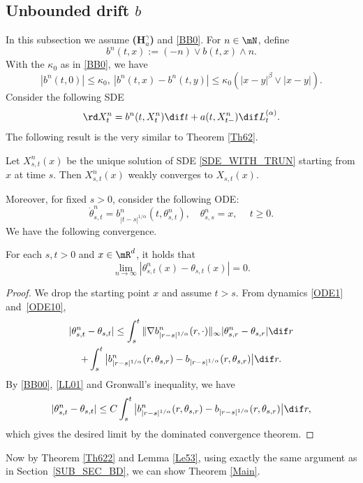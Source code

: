 \subsection{Unbounded drift $b$} \label{SUB_SEC_TRUNC}
In this subsection we assume {\bf (H$^\gamma_a$)} and \eqref{BB0}.
For $n\in\mN$, define
\[
b^n(t,x):=(-n)\vee b(t,x)\wedge n.
\]
With the $\kappa_0$ as in \eqref{BB0}, we have
\begin{equation}\label{BB00}
|b^n(t,0)|\le \kappa_0,\ |b^n(t,x)-b^n(t,y)|\leq\kappa_0(|x-y|^\beta\vee|x-y|).
\end{equation}
Consider the following SDE
\begin{equation}
\rd X_t^n=b^n(t,X_t^n)\dif t+a(t,X_{t-}^n)\dif L^{(\alpha)}_t.
\label{SDE_WITH_TRUN}
\end{equation}
The following result is the very similar to Theorem \ref{Th62}.
\begin{theorem}\label{Th622}
Let $X^n_{s,t}(x)$ be the unique solution of SDE \eqref{SDE_WITH_TRUN} starting from $x$ at time $s$. Then $X^n_{s,t}(x)$ weakly converges to $X_{s,t}(x)$.
\end{theorem}
Moreover, for fixed $s>0$, consider the following ODE:
\begin{equation}\label{ODE10}
\dot\theta^n_{s,t}=b^n_{|t-s|^{1/\alpha}}(t,\theta^n_{s,t}),\quad \theta^n_{s,s}=x,\quad \ t\geq 0.
\end{equation}
We have the following convergence.
\begin{lemma}\label{Le53}
For each $s,t>0$ and $x\in\mR^d$, it holds that
\[
\lim_{n\to\infty}|\theta^n_{s,t}(x)-\theta_{s,t}(x)|=0.
\]
\end{lemma}
\begin{proof}
We drop the starting point $x$ and assume $t\!>\!s$. From dynamics \eqref{ODE1} and~\eqref{ODE10},
\begin{multline*}
|\theta^n_{s,t}-\theta_{s,t}|
\leq\int^t_s\|\nabla b^n_{|r-s|^{1/\alpha}}(r,\cdot)\|_\infty|\theta^n_{s,r}-\theta_{s,r}|\dif r\\
+\int^t_s\big|b^n_{|r-s|^{1/\alpha}}(r,\theta_{s,r})-b_{|r-s|^{1/\alpha}}(r,\theta_{s,r})\big|\dif r.
\end{multline*}
By \eqref{BB00}, \eqref{LL01} and Gronwall's inequality, we have
\[
|\theta^n_{s,t}-\theta_{s,t}|\leq C\int^t_s\big|b^n_{|r-s|^{1/\alpha}}(r,\theta_{s,r})-b_{|r-s|^{1/\alpha}}(r,\theta_{s,r})\big|\dif r,
\]
which gives the desired limit by the dominated convergence theorem.
\end{proof}
Now by Theorem \ref{Th622} and Lemma \ref{Le53}, using exactly the same argument as in Section~\ref{SUB_SEC_BD}, we can show Theorem \ref{Main}.\enlargethispage{-\baselineskip}
